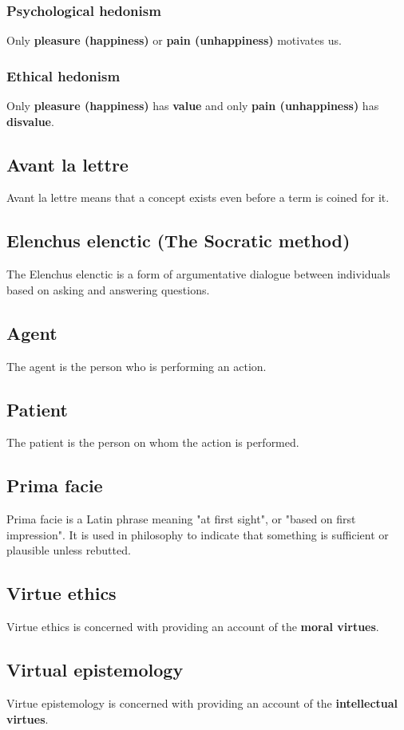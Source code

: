 \documentclass[11pt]{article}
\begin{document}
\subsubsection{Psychological hedonism}
\label{sec:org18cec9e}
Only \textbf{pleasure (happiness)} or \textbf{pain (unhappiness)} motivates us.
\subsubsection{Ethical hedonism}
\label{sec:org91fb2d3}
Only \textbf{pleasure (happiness)} has \textbf{value} and only \textbf{pain (unhappiness)} has \textbf{disvalue}.
\subsection{Avant la lettre}
\label{sec:org50fcf10}
Avant la lettre means that a concept exists even before a term is coined for it.
\subsection{Elenchus elenctic (The Socratic method)}
\label{sec:orgff57fcc}
The Elenchus elenctic is a form of argumentative dialogue between individuals based on asking and answering questions.
\subsection{Agent}
\label{sec:org2370507}
The agent is the person who is performing an action.
\subsection{Patient}
\label{sec:org58fcd12}
The patient is the person on whom the action is performed.
\subsection{Prima facie}
\label{sec:org61e50e9}
Prima facie is a Latin phrase meaning "at first sight", or "based on first impression". It is used in philosophy to indicate that something is sufficient or plausible unless rebutted.
\subsection{Virtue ethics}
\label{sec:org4565921}
Virtue ethics is concerned with providing an account of the \textbf{moral virtues}.
\subsection{Virtual epistemology}
\label{sec:org8b809a1}
Virtue epistemology is concerned with providing an account of the \textbf{intellectual virtues}.
\end{document}
